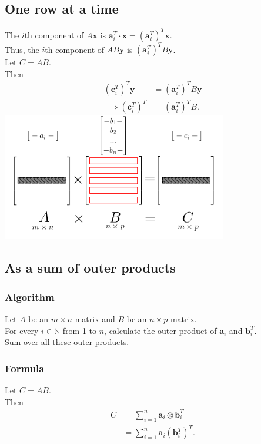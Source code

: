 \documentclass{scrartcl}
\begin{document}
\subsection{One row at a time}
The \(i\)th component of \(A\mathbf{x}\) is \(\mathbf{a}^T_i \cdot \mathbf{x} = (\mathbf{a}^T_i)^T\mathbf{x}\).\\
Thus, the \(i\)th component of \(AB\mathbf{y}\) is \((\mathbf{a}^T_i)^TB\mathbf{y}\).\\
Let \(C = AB\).\\
Then
\begin{align*}
  (\mathbf{c}^T_i)^T\mathbf{y} &= (\mathbf{a}^T_i)^TB\mathbf{y}\\
  \implies (\mathbf{c}^T_i)^T &= (\mathbf{a}^T_i)^TB\text{.}
\end{align*}
\includegraphics[height=15em]{one-row-at-a-time.png}

\subsection{As a sum of outer products}
\subsubsection*{Algorithm}
Let \(A\) be an \(m \times n\) matrix and \(B\) be an \(n \times p\) matrix.\\
For every \(i \in \mathbb{N}\) from 1 to \(n\), calculate the outer product of \(\mathbf{a}_i\) and \(\mathbf{b}^T_i\).\\
Sum over all these outer products.
\subsubsection*{Formula}
Let \(C = AB\).\\
Then
\begin{align*}
  C &= \sum_{i = 1}^n\mathbf{a}_i \otimes \mathbf{b}^T_i\\
    &= \sum_{i = 1}^n\mathbf{a}_i(\mathbf{b}^T_i)^T\text{.}
\end{align*}
\end{document}
